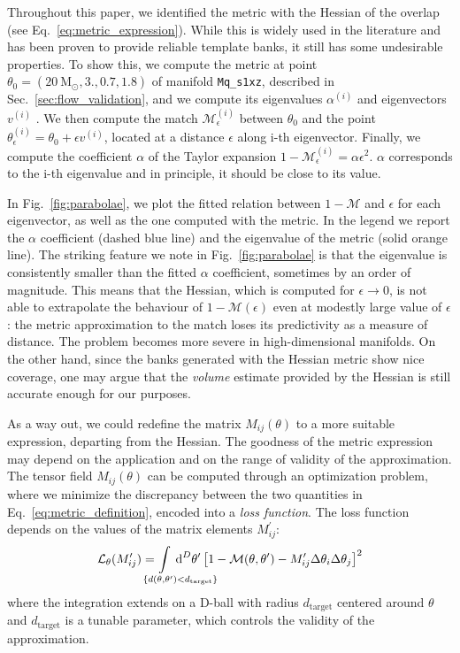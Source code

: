 \documentclass[twocolumn,showpacs,preprintnumbers,nofootinbib,prd,
superscriptaddress,10pt]{revtex4-2}
\newcommand{\dvol}[2]{\ensuremath{\operatorname{d}^{#2}\!{#1}}}
\begin{document}
Throughout this paper, we identified the metric with the Hessian of the overlap (see Eq.~\eqref{eq:metric_expression}). While this is widely used in the literature \cite{owen_metric, Messenger:2008ta} and has been proven to provide reliable template banks, it still has some undesirable properties.
To show this, we compute the metric at point $\theta_0 = (\SI{20}{\mathrm{M_\odot}}, 3., 0.7, 1.8)$ of manifold \texttt{Mq\_s1xz}, described in Sec.~\ref{sec:flow_validation}, and we compute its eigenvalues $\alpha^{(i)}$ and eigenvectors $v^{(i)}$ . We then compute the match $\mathcal{M}^{(i)}_\epsilon$ between $\theta_0$ and the point $\theta^{(i)}_\epsilon = \theta_0 + \epsilon v^{(i)}$, located at a distance $\epsilon$ along i-th eigenvector.
Finally, we  compute the coefficient $\alpha$ of the Taylor expansion $1 - \mathcal{M}^{(i)}_\epsilon = \alpha  \epsilon^2$.
$\alpha$ corresponds to the i-th eigenvalue and in principle, it should be close to its value.

In Fig.~\ref{fig:parabolae}, we plot the fitted relation between $1 - \mathcal{M}$ and $\epsilon$ for each eigenvector, as well as the one computed with the metric. In the legend we report the $\alpha$ coefficient (dashed blue line) and the eigenvalue of the metric (solid orange line).
The striking feature we note in Fig.~\ref{fig:parabolae} is that the eigenvalue is consistently smaller than the fitted $\alpha$ coefficient, sometimes by an order of magnitude.
This means that the Hessian, which is computed for $\epsilon\rightarrow 0$, is not able to extrapolate the behaviour of $1 - \mathcal{M}(\epsilon)$ even at modestly large value of $\epsilon$: the metric approximation to the match loses its predictivity as a measure of distance.
The problem becomes more severe in high-dimensional manifolds.
On the other hand, since the banks generated with the Hessian metric show nice coverage, one may argue that the {\it volume} estimate provided by the Hessian is still accurate enough for our purposes.

As a way out, we could redefine the matrix $M_{ij}(\theta)$ to a more suitable expression, departing from the Hessian.
The goodness of the metric expression may depend on the application and on the range of validity of the approximation.
The tensor field $M_{ij}(\theta)$ can be computed through an optimization problem, where we minimize the discrepancy between the two quantities in Eq.~\eqref{eq:metric_definition}, encoded into a {\it loss function}.
The loss function depends on the values of the matrix elements $M^\prime_{ij}$:
\begin{equation} \label{eq:loss_function}
	\mathcal{L}_\theta(M^\prime_{ij}) = \hspace{-4em} \int\limits_{\hspace{3em}\{d(\theta,\theta^\prime) < d_\mathrm{target}\}} \hspace{-3.8em}
		\dvol{\theta^\prime}{D}  \left[ 1 - \mathcal{M}(\theta,\theta^\prime) - M^\prime_{ij} \Delta\theta_i \Delta\theta_j \right]^2
\end{equation}
where the integration extends on a D-ball with radius $d_\mathrm{target}$ centered around $\theta$ and $d_\mathrm{target}$ is a tunable parameter, which controls the validity of the approximation.
\end{document}
